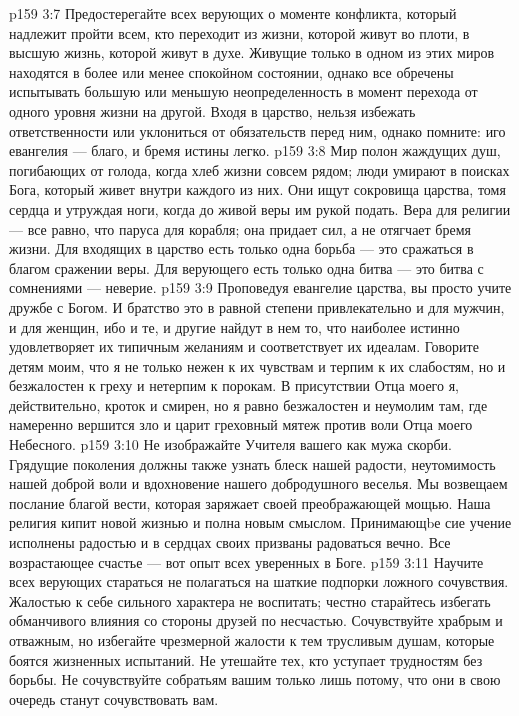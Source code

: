 \vs p159 3:7 Предостерегайте всех верующих о моменте конфликта, который надлежит пройти всем, кто переходит из жизни, которой живут во плоти, в высшую жизнь, которой живут в духе. Живущие только в одном из этих миров находятся в более или менее спокойном состоянии, однако все обречены испытывать большую или меньшую неопределенность в момент перехода от одного уровня жизни на другой. Входя в царство, нельзя избежать ответственности или уклониться от обязательств перед ним, однако помните: иго евангелия --- благо, и бремя истины легко.
\vs p159 3:8 Мир полон жаждущих душ, погибающих от голода, когда хлеб жизни совсем рядом; люди умирают в поисках Бога, который живет внутри каждого из них. Они ищут сокровища царства, томя сердца и утруждая ноги, когда до живой веры им рукой подать. Вера для религии --- все равно, что паруса для корабля; она придает сил, а не отягчает бремя жизни. Для входящих в царство есть только одна борьба --- это сражаться в благом сражении веры. Для верующего есть только одна битва --- это битва с сомнениями --- неверие.
\vs p159 3:9 Проповедуя евангелие царства, вы просто учите дружбе с Богом. И братство это в равной степени привлекательно и для мужчин, и для женщин, ибо и те, и другие найдут в нем то, что наиболее истинно удовлетворяет их типичным желаниям и соответствует их идеалам. Говорите детям моим, что я не только нежен к их чувствам и терпим к их слабостям, но и безжалостен к греху и нетерпим к порокам. В присутствии Отца моего я, действительно, кроток и смирен, но я равно безжалостен и неумолим там, где намеренно вершится зло и царит греховный мятеж против воли Отца моего Небесного.
\vs p159 3:10 Не изображайте Учителя вашего как мужа скорби. Грядущие поколения должны также узнать блеск нашей радости, неутомимость нашей доброй воли и вдохновение нашего добродушного веселья. Мы возвещаем послание благой вести, которая заряжает своей преображающей мощью. Наша религия кипит новой жизнью и полна новым смыслом. Принимающbе сие учение исполнены радостью и в сердцах своих призваны радоваться вечно. Все возрастающее счастье --- вот опыт всех уверенных в Боге.
\vs p159 3:11 Научите всех верующих стараться не полагаться на шаткие подпорки ложного сочувствия. Жалостью к себе сильного характера не воспитать; честно старайтесь избегать обманчивого влияния со стороны друзей по несчастью. Сочувствуйте храбрым и отважным, но избегайте чрезмерной жалости к тем трусливым душам, которые боятся жизненных испытаний. Не утешайте тех, кто уступает трудностям без борьбы. Не сочувствуйте собратьям вашим только лишь потому, что они в свою очередь станут сочувствовать вам.
